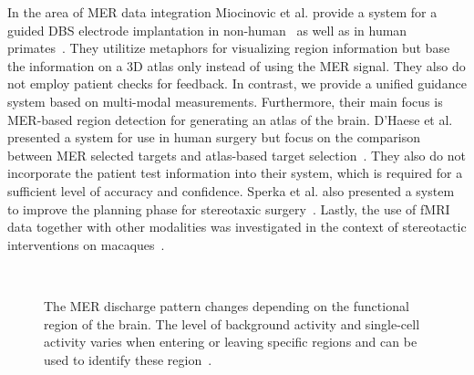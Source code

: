 \documentclass{vgtc}                          %
\begin{document}
In the area of MER data integration Miocinovic et al. provide a system for a guided DBS electrode implantation in non-human~\cite{Miocinovic2007} as well as in human primates~\cite{Cicerone2}. They utilitize metaphors for visualizing region information but base the information on a 3D atlas only instead of using the MER signal. They also do not employ patient checks for feedback. In contrast, we provide a unified guidance system based on multi-modal measurements. Furthermore, their main focus is MER-based region detection for generating an atlas of the brain. D'Haese et al. presented a system for use in human surgery but focus on the comparison between MER selected targets and atlas-based target selection~\cite{Haese2005}. They also do not incorporate the patient test information into their system, which is required for a sufficient level of accuracy and confidence. Sperka et al. also presented a system to improve the planning phase for stereotaxic surgery~\cite{Sperka2011}. Lastly, the use of fMRI data together with other modalities was investigated in the context of stereotactic interventions on macaques~\cite{Ohayon2012}.
%
%
%

\begin{figure}
    \centering
    \\
    \caption{The MER discharge pattern changes depending on the functional region of the brain. The level of background activity and single-cell activity varies when entering or leaving specific regions and can be used to identify these region~\cite{Benazzouz2002,Hutchison1998}.}
    \label{fig:dischargepatterns}
\end{figure}
\end{document}

